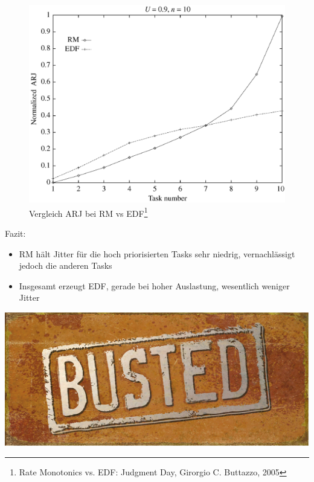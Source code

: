 \begin{frame}{\subsecname}
	\begin{center}
	\begin{figure}
		\includegraphics[scale=.20]{graphics/vergleich/jitter.png}
		\caption{Vergleich ARJ bei RM vs EDF\footnote{Rate Monotonics vs. EDF: Judgment Day, Girorgio C. Buttazzo, 2005}}	
	\end{figure}
	\end{center}
\end{frame}

\begin{frame}{\subsecname}
	Fazit:
	\begin{itemize}
		\item RM hält Jitter für die hoch priorisierten Tasks sehr niedrig, vernachlässigt jedoch die anderen Tasks
		\item Insgesamt erzeugt EDF, gerade bei hoher Auslastung, wesentlich weniger Jitter
	\end{itemize}
\end{frame}

\begin{frame}{\subsecname}
	\begin{center}
			\includegraphics[scale=1]{graphics/memes/busted.jpg}
	\end{center}
\end{frame}

%